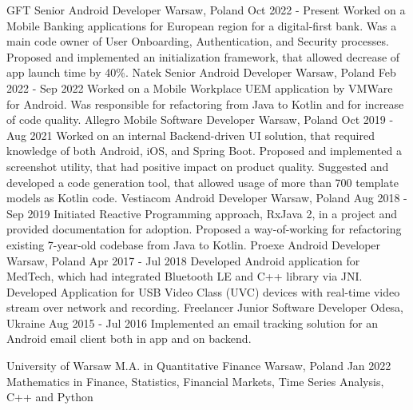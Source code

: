 \documentclass[10pt]{ms-cv}
\begin{document}
\cvexperience
  {GFT}
  {Senior Android Developer}
  {Warsaw, Poland}
  {Oct 2022 - Present}
  {
    Worked on a Mobile Banking applications for European region for a digital-first bank.
    \newline
    Was a main code owner of User Onboarding, Authentication, and Security processes.
    \newline
    Proposed and implemented an initialization framework, that allowed decrease of app launch time by 40\%.
  }
\cvexperience
  {Natek}
  {Senior Android Developer}
  {Warsaw, Poland}
  {Feb 2022 - Sep 2022}
  {
    Worked on a Mobile Workplace UEM application by VMWare for Android.
    \newline
    Was responsible for refactoring from Java to Kotlin and for increase of code quality.
  }
\cvexperience
  {Allegro}
  {Mobile Software Developer}
  {Warsaw, Poland}
  {Oct 2019 - Aug 2021}
  {
    Worked on an internal Backend-driven UI solution, that required knowledge of both Android, iOS, and Spring Boot.
    \newline
    Proposed and implemented a screenshot utility, that had positive impact on product quality.
    \newline
    Suggested and developed a code generation tool, that allowed usage of more than 700 template models as Kotlin code.
  }
\cvexperience
  {Vestiacom}
  {Android Developer}
  {Warsaw, Poland}
  {Aug 2018 - Sep 2019}
  {
    Initiated Reactive Programming approach, RxJava 2, in a project and provided documentation for adoption.
    \newline
    Proposed a way-of-working for refactoring existing 7-year-old codebase from Java to Kotlin.
  }
\cvexperience
  {Proexe}
  {Android Developer}
  {Warsaw, Poland}
  {Apr 2017 - Jul 2018}
  {
    Developed Android application for MedTech, which had integrated Bluetooth LE and C++ library via JNI.
    \newline
    Developed Application for USB Video Class (UVC) devices with real-time video stream over network and recording.
  }
\cvexperience
  {Freelancer}
  {Junior Software Developer}
  {Odesa, Ukraine}
  {Aug 2015 - Jul 2016}
  {
    Implemented an email tracking solution for an Android email client both in app and on backend.
  }

\vspace{\baselineskip}

\cvexperience
  {University of Warsaw}
  {M.A. in Quantitative Finance}
  {Warsaw, Poland}
  {Jan 2022}
  {Mathematics in Finance, Statistics, Financial Markets, Time Series Analysis, C++ and Python}

\end{document}
